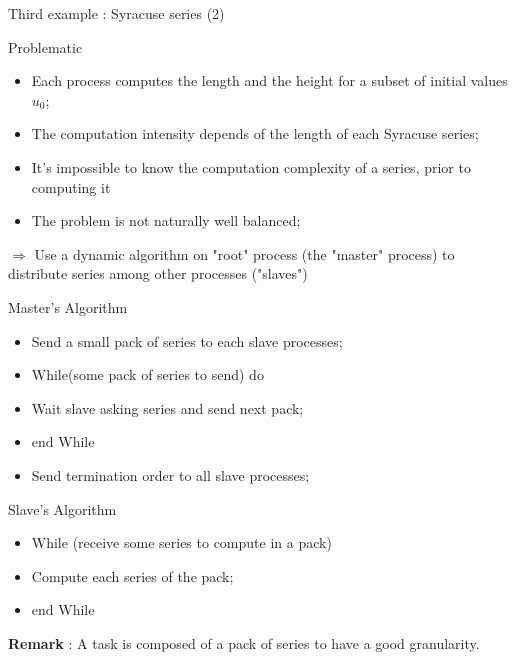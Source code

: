 \documentclass[compress,10pt,aspectratio=169]{beamer}
\begin{document}
\begin{frame}[fragile]{Third example : Syracuse series (2)}
    \scriptsize
    \begin{block}{\small Problematic}
        \begin{itemize}
            \item Each process computes the length and the height for a subset of initial values $u_{0}$;
            \item The computation intensity depends of the length of each Syracuse series;
            \item It's impossible to know the computation complexity of a series, prior to computing it
            \item The problem is not naturally well balanced;
        \end{itemize}
        $\Rightarrow$ Use a dynamic algorithm on "root" process (the "master" process) to distribute series among other processes ("slaves")
    \end{block}

    \begin{multicols}{2}
        \begin{exampleblock}{\small Master's Algorithm}
            \begin{itemize}
                \item Send a small pack of series to each slave processes;
                \item While(some pack of series to send) do 
                \item \hspace*{2mm}Wait slave asking series and send next pack;
                \item end While
                \item Send termination order to all slave processes;
            \end{itemize}
        \end{exampleblock}

        \begin{exampleblock}{\small Slave's Algorithm}
            \begin{itemize}
                \item While (receive some series to compute in a pack)
                \item \hspace*{2mm}Compute each series of the pack;
                \item end While
            \end{itemize}
        \end{exampleblock}
    \end{multicols}

    \textbf{Remark} : A task is composed of a pack of series to have a good granularity.

\end{frame}
\end{document}
